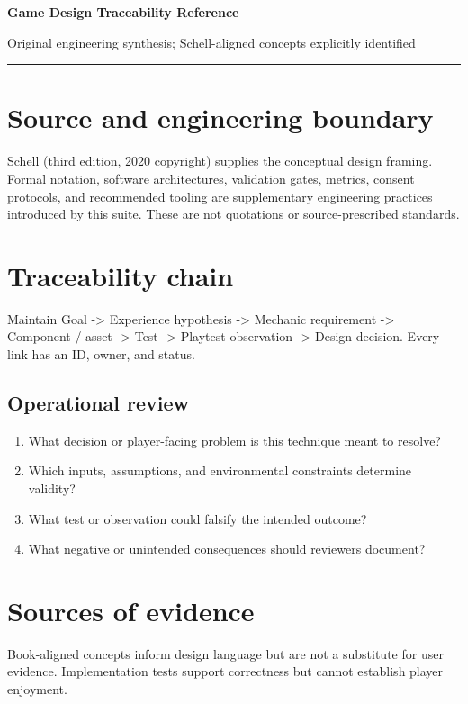 \documentclass[11pt]{article}
\begin{document}
{\huge\bfseries\color{suiteblue} Game Design Traceability Reference}\par
\vspace{0.15in}
{\normalsize\color{suitegray} Original engineering synthesis; Schell-aligned concepts explicitly identified}\par
\vspace{0.15in}\hrule\vspace{0.15in}

\section{Source and engineering boundary}
Schell (third edition, 2020 copyright) supplies the conceptual design framing. Formal notation, software architectures, validation gates, metrics, consent protocols, and recommended tooling are supplementary engineering practices introduced by this suite. These are not quotations or source-prescribed standards.


\section{Traceability chain}
Maintain Goal -> Experience hypothesis -> Mechanic requirement -> Component / asset -> Test -> Playtest observation -> Design decision. Every link has an ID, owner, and status.


\subsection{Operational review}
\begin{enumerate}
\item What decision or player-facing problem is this technique meant to resolve?
\item Which inputs, assumptions, and environmental constraints determine validity?
\item What test or observation could falsify the intended outcome?
\item What negative or unintended consequences should reviewers document?
\end{enumerate}

\section{Sources of evidence}
Book-aligned concepts inform design language but are not a substitute for user evidence. Implementation tests support correctness but cannot establish player enjoyment.
\end{document}
